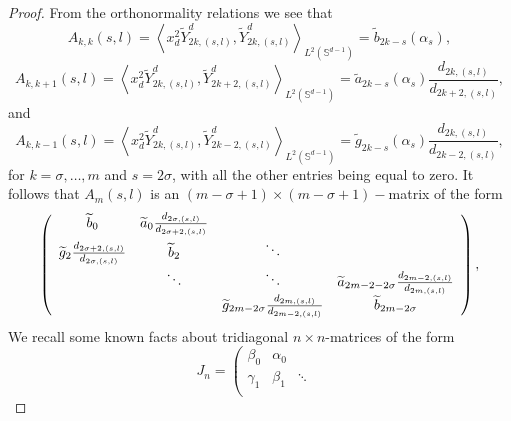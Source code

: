 \documentclass[10pt,a4paper]{amsart}
\begin{document}
\begin{proof}
From the orthonormality relations we see that 
\begin{equation*}
A_{k,k}\left( s,l\right) =\left\langle x_{d}^{2}\widetilde{Y}^d_{2k,\left(
s,l\right) },\widetilde{Y}^d_{2k,\left( s,l\right) }\right\rangle_{L^2(\mathbb{S}^{d-1})}
=\widetilde{b}_{2k-s}\left( \alpha _{s}\right), 
\end{equation*}
\begin{equation*}
A_{k,k+1}\left( s,l\right) =\left\langle x_{d}^{2}\widetilde{Y}^d_{2k,\left(
s,l\right) },\widetilde{Y}^d_{2k+2,\left( s,l\right) }\right\rangle _{L^2(\mathbb{S}^{d-1})}
=
\widetilde{a}_{2k-s}\left( \alpha _{s}\right) \frac{d_{2k,\left(
s,l\right) }}{d_{2k+2,\left( s,l\right) }},
\end{equation*}
and 
\begin{equation*}
A_{k,k-1}\left( s,l\right) =\left\langle x_{d}^{2}\widetilde{Y}^d_{2k,\left(
s,l\right) },\widetilde{Y}^d_{2k-2,\left( s,l\right) }\right\rangle _{L^2(\mathbb{S}^{d-1})}
=
\widetilde{g}_{2k-s}\left( \alpha _{s}\right) \frac{d_{2k,\left(
s,l\right) }}{d_{2k-2,\left( s,l\right) }},
\end{equation*}
for $k=\sigma ,\dots , m$ and $s=2\sigma$, with all the other entries being equal to zero.  It follows that $
A_{m}\left( s,l\right) $ is an $\left( m-\sigma +1\right) \times \left(
m-\sigma +1\right) -$matrix of the form 
\begin{equation*}
\left( 
\begin{array}{cccc}
\widetilde{b}_{0} & \widetilde{a}_{0}\frac{d_{2\sigma ,\left( s,l\right) }}{%
d_{2\sigma +2,\left( s,l\right) }} &  &  \\ 
\widetilde{g}_{2}\frac{d_{2\sigma +2,\left( s,l\right) }}{d_{2\sigma ,\left(
s,l\right) }} & \widetilde{b}_{2} & \ddots &  \\ 
& \ddots & \ddots & \widetilde{a}_{2m - 2-2\sigma }\frac{d_{2m-2,\left( s,l\right) }}{d_{2m,\left( s,l\right)
}} \\ 
&  & \widetilde{g}_{2m-2\sigma }\frac{
d_{2m,\left( s,l\right) }}{d_{2m-2,\left( s,l\right) }} & \widetilde{b}_{2m-2\sigma }
\end{array}%
\right),
\end{equation*}
  We recall some known facts about tridiagonal $n\times n$-matrices of the form 
\begin{equation*}
J_{n}=\left( 
\begin{array}{cccc}
\beta _{0} & \alpha _{0} &  &  \\ 
\gamma _{1} & \beta _{1} & \ddots &  \\ 

\end{array}
\end{equation*}
\end{proof}
\end{document}
